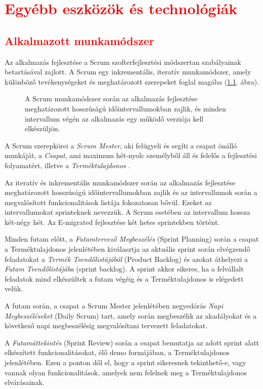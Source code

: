 \chapter{\textcolor{red}{Egyébb eszközök és technológiák}}\label{ch:egyebb_eszkozok}
\section{\textcolor{red}{Alkalmazott munkamódszer}}
Az alkalmazás fejlesztése a Scrum szofterfejlesztési módszertan szabályainak betartásával zajlott. A Scrum egy inkrementális, iteratív munkamódszer, amely különböző tevékenységeket és meghatározott szerepeket foglal magába (\ref{fig:scrum}. ábra). 
\begin{figure}
  \centering
  \caption{A Scrum munkamódszer során az alkalmazás fejlesztése meghatározott hosszúságú időintervallumokban zajlik, és minden intervallum végén az alkalmazás egy működő verziója kell elkészüljön.}
  \label{fig:scrum}
\end{figure}
A Scrum szerepkörei a \textsl{Scrum Mester}, aki felügyeli és segíti a csapat önálló munkáját, a \textsl{Csapat}, ami maximum hét-nyolc személyből áll és felelős a fejlesztési folyamatért, illetve a \textsl{Terméktulajdonos} \cite{Scrum}. 

Az iteratív és inkrementális munkamódszer során az alkalmazás fejlesztése meghatározott hosszúságú időintervallumokban zajlik és az intervallumok során a megvalósított funkcionalitások listája fokozatosan bővül. Ezeket az intervallumokat sprinteknek nevezzük. A Scrum esetében az intervallum hossza két-négy hét. Az E-migrated fejlesztése két hetes sprintekben történt.

Minden futam előtt, a \textsl{Futamtervező Megbeszélés} (Sprint Planning) során a csapat a Terméktulajdonos jelenlétében kiválasztja az aktuális sprint során elvégzendő feladatokat a \textsl{Termék Teendőlistájából} (Product Backlog) és azokat áthelyezi a \textsl{Futam Teendőlistájába} (sprint backlog). A sprint akkor sikeres, ha a felvállalt feladatok mind elkészültek a futam végéig és a Terméktulajdonos is elégedett velük. 

A futam során, a csapat a Scrum Mester jelenlétében negyedórás \textsl{Napi Megbeszéléseket} (Daily Scrum) tart, amely során megbeszélik az akadályokat és a következő napi megbeszélésig megvalósítani tervezett feladatokat. 

A \textsl{Futamáttekintés} (Sprint Review) során a csapat bemutatja az adott sprint alatt elkészített funkcionalitásokat, élő demo formájában, a Terméktulajdonos jelenlétében. Ezen a ponton dől el, hogy a sprint sikeresnek tekinthető-e, vagy vannak olyan funkcionalitások, amelyek nem felelnek meg a Terméktulajdonos elvárásainak. 

